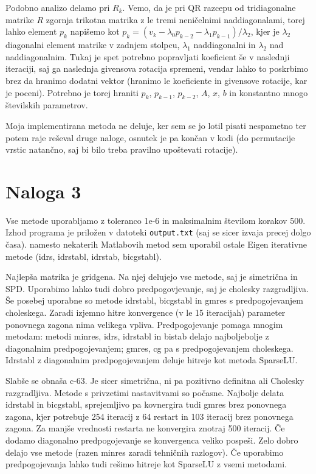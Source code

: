 \documentclass{article}
\begin{document}
    Podobno analizo delamo pri \(R_k\). Vemo, da je pri QR razcepu od tridiagonalne matrike \(R\) zgornja trikotna matrika z le tremi neničelnimi naddiagonalami, torej lahko element \(p_k\) napišemo kot \(p_k = (v_k - \lambda_0 p_{k-2} - \lambda_1 p_{k-1})/\lambda_2\), kjer je \(\lambda_2\) diagonalni element matrike v zadnjem stolpcu, \(\lambda_1\) naddiagonalni in \(\lambda_2\) nad naddiagonalnim. Tukaj je spet potrebno popravljati koeficient še v naslednji iteraciji, saj ga naslednja givensova rotacija spremeni, vendar lahko to poskrbimo brez da hranimo dodatni vektor (hranimo le koeficiente in givensove rotacije, kar je poceni). Potrebno je torej hraniti \(p_k\), \(p_{k-1}\), \(p_{k-2}\), \(A\), \(x\), \(b\) in konstantno mnogo številskih parametrov.

    Moja implementirana metoda ne deluje, ker sem se jo lotil pisati nespametno ter potem raje reševal druge naloge, osnutek je pa končan v kodi (do permutacije vrstic natančno, saj bi bilo treba pravilno upoštevati rotacije).


    \section{Naloga 3}
    Vse metode uporabljamo z toleranco 1e-6 in maksimalnim številom korakov 500. Izhod programa je priložen v datoteki \verb|output.txt| (saj se sicer izvaja precej dolgo časa). namesto nekaterih Matlabovih metod sem uporabil ostale Eigen iterativne metode (idrs, idrstabl, idrstab, bicgstabl).
    
    Najlepša matrika je gridgena. Na njej delujejo vse metode, saj je simetrična in SPD. Uporabimo lahko tudi dobro predpogovjevanje, saj je cholesky razgradljiva. Še posebej uporabne so metode idrstabl, bicgstabl in gmres s predpogojevanjem choleskega. Zaradi izjemno hitre konvergence (v le 15 iteracijah) parameter ponovnega zagona nima velikega vpliva. Predpogojevanje pomaga mnogim metodam: metodi minres, idrs, idrstabl in bistab delajo najboljebolje z diagonalnim predpogojevanjem; gmres, cg pa s predpogojevanjem choleskega. Idrstabl z diagonalnim predpogojevanjem deluje hitreje kot metoda SparseLU.

    Slabše se obnaša c-63. Je sicer simetrična, ni pa pozitivno definitna ali Cholesky razgradljiva. Metode s privzetimi nastavitvami so počasne. Najbolje delata idrstabl in bicgstabl, sprejemljivo pa kovnergira tudi gmres brez ponovnega zagona, kjer potrebuje 254 iteracij z 64 restart in 103 iteracij brez ponovnega zagona. Za manjše vrednosti restarta ne konvergira znotraj 500 iteracij. Če dodamo diagonalno predpogojevanje se konvergenca veliko pospeši. Zelo dobro delajo vse metode (razen minres zaradi tehničnih razlogov). Če uporabimo predpogojevanja lahko tudi rešimo hitreje kot SparseLU z vsemi metodami.
\end{document}
